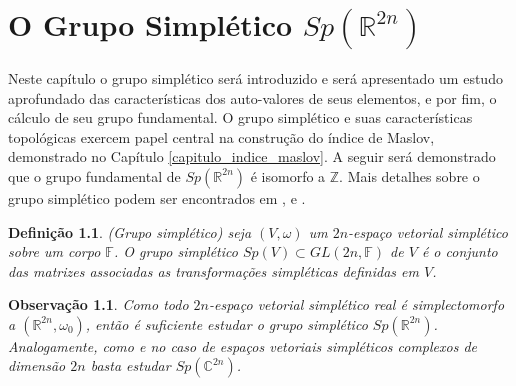 \documentclass[12pt]{book}
\newtheorem{definicao}[teorema]{Definição}
\newtheorem{observacao}[teorema]{Observação}
\newcommand{\complexo}[1]{\mathbb{C}^{#1}}
\newcommand{\gruposimpletico}[1]{Sp(#1)}
\newcommand{\inteiros}{\mathbb{Z}}
\newcommand{\real}[1]{\mathbb{R}^{#1}}
\begin{document}
	\chapter{O Grupo Simplético $\gruposimpletico{\real{2n}}$}\label{capitulo_grupo_simpletico}
	
	Neste capítulo o grupo simplético será introduzido e será apresentado um estudo aprofundado das características dos auto-valores de seus elementos, e por fim, o cálculo de seu grupo fundamental. O grupo simplético e suas características topológicas exercem papel central na construção do índice de Maslov, demonstrado no Capítulo \ref{capitulo_indice_maslov}. A seguir será demonstrado que o grupo fundamental de $\gruposimpletico{\real{2n}}$ é isomorfo a $\inteiros$. Mais detalhes sobre o grupo simplético podem ser encontrados em \cite{audi_floer_homology}, \cite{gonsson} e \cite{mcduff_salamon}.

	\begin{definicao}\label{definicao_grupo_simpletico}
		(Grupo simplético) seja $(V, \omega)$ um $2n$-espaço vetorial simplético sobre um corpo $\mathbb{F}$. O grupo simplético $\gruposimpletico{V} \subset GL(2n, \mathbb{F})$ de $V$ é o conjunto das matrizes associadas as transformações simpléticas definidas em $V$.
	\end{definicao}


	\begin{observacao}
		Como todo $2n$-espaço vetorial simplético real é simplectomorfo a $(\real{2n}, \omega_{0})$, então é suficiente estudar o grupo simplético $\gruposimpletico{\real{2n}}$. Analogamente, como  e no caso de espaços vetoriais simpléticos complexos de dimensão $2n$ basta estudar $\gruposimpletico{\complexo{2n}}$. 
	\end{observacao}
	
\end{document}
